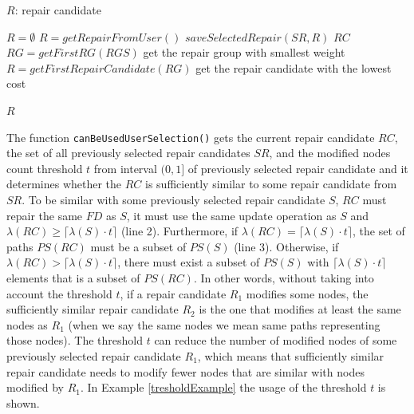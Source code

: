 \begin{algorithm}[H]
\caption{$selectRepairByUser(RGS, SR, t)$}
\label{selectUser}
\begin{algorithmic}[1]
\ENSURE $R$: repair candidate

\STATE $R = \emptyset$
    \STATE $R = getRepairFromUser()$ 
    \STATE $saveSelectedRepair(SR, R)$
                \RETURN $RC$
            \ENDIF
        \ENDFOR
    \ENDFOR
    \STATE $RG = getFirstRG(RGS)$ \COMMENT get the repair group with smallest weight
    \STATE $R = getFirstRepairCandidate(RG)$ \COMMENT get the repair candidate with the lowest cost
\ENDIF

\RETURN $R$
\end{algorithmic}
\end{algorithm}

The function \texttt{canBeUsedUserSelection()} gets the current repair candidate $RC$, the set of all previously selected repair candidates $SR$, and the modified nodes count threshold $t$ from interval $(0,1]$ of previously selected repair candidate and it determines whether the $RC$ is sufficiently similar to some repair candidate from $SR$. To be similar with some previously selected repair candidate $S$, $RC$ must repair the same $FD$ as $S$, it must use the same update operation as $S$ and $\lambda(RC) \geq \lceil\lambda(S) \cdot t\rceil$ (line 2). Furthermore, if $\lambda(RC) = \lceil\lambda(S) \cdot t\rceil$, the set of paths $PS(RC)$ must be a subset of $PS(S)$ (line 3). Otherwise, if $\lambda(RC) > \lceil\lambda(S) \cdot t\rceil$, there must exist a subset of $PS(S)$ with $\lceil\lambda(S) \cdot t\rceil$ elements that is a subset of $PS(RC)$. In other words, without taking into account the threshold $t$, if a repair candidate $R_1$ modifies some nodes, the sufficiently similar repair candidate $R_2$ is the one that modifies at least the same nodes as $R_1$ (when we say the same nodes we mean same paths representing those nodes). The threshold $t$ can reduce the number of modified nodes of some previously selected repair candidate $R_1$, which means that sufficiently similar repair candidate needs to modify fewer nodes that are similar with nodes modified by $R_1$. In Example \ref{tresholdExample} the usage of the threshold $t$ is shown.


